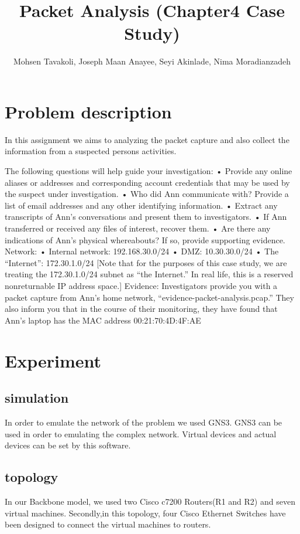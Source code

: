 \documentclass{article}
\title{Packet Analysis (Chapter4 Case Study)}
\author{Mohsen Tavakoli, Joseph Maan Anayee, Seyi Akinlade, Nima Moradianzadeh}
\begin{document}
\maketitle

\section{Problem description}
In this assignment we aims to analyzing the packet capture and also collect the information from a suspected persons activities.
 
The following questions will help guide your investigation:
• Provide any online aliases or addresses and corresponding account credentials that
may be used by the suspect under investigation.
• Who did Ann communicate with? Provide a list of email addresses and any other
identifying information.
• Extract any transcripts of Ann’s conversations and present them to investigators.
• If Ann transferred or received any files of interest, recover them.
• Are there any indications of Ann’s physical whereabouts? If so, provide supporting
evidence.
Network:
• Internal network: 192.168.30.0/24
• DMZ: 10.30.30.0/24
• The “Internet”: 172.30.1.0/24 [Note that for the purposes of this case study, we are
treating the 172.30.1.0/24 subnet as “the Internet.” In real life, this is a reserved nonreturnable
IP address space.]
Evidence: Investigators provide you with a packet capture from Ann’s home network,
“evidence-packet-analysis.pcap.” They also inform you that in the course of their monitoring,
they have found that Ann’s laptop has the MAC address 00:21:70:4D:4F:AE
\section{Experiment}
\subsection{simulation}
In order to emulate the network of the problem we used GNS3. GNS3 can be used in order to emulating the complex network. Virtual devices and actual devices can be set by this software\cite{amyot2014system}.


\subsection{topology}
In our Backbone model, we used two Cisco c7200 Routers(R1 and R2) and seven virtual machines. Secondly,in this topology, four Cisco Ethernet Switches have been designed to connect the virtual machines to routers.
\end{document}
